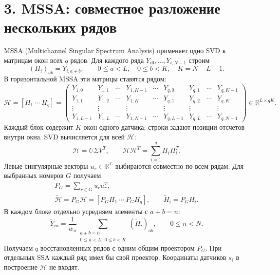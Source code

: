 \documentclass[11pt,a4paper]{article}
\begin{document}
\section*{3. MSSA: совместное разложение нескольких рядов}
MSSA (Multichannel Singular Spectrum Analysis) применяет одно SVD
к матрицам окон всех $q$ рядов.
Для каждого ряда $Y_{i0},\ldots,Y_{i,N-1}$ строим
\[
 (H_i)_{ab}=Y_{i,a+b},\qquad
 0\leq a<L,\quad 0\leq b<K,\quad K=N-L+1.
\]
В горизонтальной MSSA эти матрицы ставятся рядом:
\[
 \mathcal H=[H_1\ \cdots\ H_q]
 =\left(\begin{array}{cccc|c|cccc}
 Y_{1,0}&Y_{1,1}&\cdots&Y_{1,K-1}&\cdots&
 Y_{q,0}&Y_{q,1}&\cdots&Y_{q,K-1}\\
 Y_{1,1}&Y_{1,2}&\cdots&Y_{1,K}&\cdots&
 Y_{q,1}&Y_{q,2}&\cdots&Y_{q,K}\\
 \vdots&\vdots&&\vdots&&\vdots&\vdots&&\vdots\\
 Y_{1,L-1}&Y_{1,L}&\cdots&Y_{1,N-1}&\cdots&
 Y_{q,L-1}&Y_{q,L}&\cdots&Y_{q,N-1}
 \end{array}\right)
 \in\mathbb R^{L\times qK}.
\]
Каждый блок содержит $K$ окон одного датчика; строки задают позиции
отсчетов внутри окна. SVD вычисляется для всей $\mathcal H$:
\[
 \mathcal H=U\Sigma V^T,\qquad
 \mathcal H\mathcal H^T=\sum_{i=1}^qH_iH_i^T.
\]
Левые сингулярные векторы $u_r\in\mathbb R^L$ выбираются совместно
по всем рядам. Для выбранных номеров $G$ получаем
\begin{gather*}
 P_G=\sum_{r\in G}u_ru_r^T,\\
 \widetilde{\mathcal H}=P_G\mathcal H
 =[P_GH_1\ \cdots\ P_GH_q],\qquad
 \widetilde H_i=P_GH_i.
\end{gather*}
В каждом блоке отдельно усредняем элементы с $a+b=n$:
\[
 \widetilde Y_{in}
 =\frac1{w_n}\sum_{\substack{a+b=n\\0\leq a<L,\;0\leq b<K}}
 (\widetilde H_i)_{ab},\qquad 0\leq n<N.
\]
Получаем $q$ восстановленных рядов с одним общим проектором $P_G$.
При отдельных SSA каждый ряд имел бы свой проектор.
Координаты датчиков $s_i$ в построение $\mathcal H$ не входят.
\end{document}
